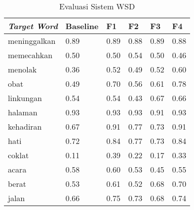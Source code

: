 \begin{table}
	\centering
	\caption{Evaluasi Sistem WSD}
	\label{table:wsd-evaluation}
	\begin{tabular}{|p{3cm}|p{1.5cm}|p{1.5cm}|p{1.5cm}|p{1.5cm}|p{1.5cm}|}
		\hline
		\textit{Target Word} & Baseline & F1 & F2 & F3 & F4
		\\ \hline
		meninggalkan & 0.89 & 0.89 & 0.88 & 0.89 & 0.88
		\\ \hline
		memecahkan & 0.50 & 0.50 & \cellcolor{blue!25}0.54 & 0.50 & 0.46
		\\ \hline
		menolak & 0.36 & \cellcolor{blue!25}0.52 & \cellcolor{blue!25}0.49 & \cellcolor{blue!25}0.52 & \cellcolor{blue!25}0.60
		\\ \hline
		obat & 0.49 & \cellcolor{blue!25}0.70 & \cellcolor{blue!25}0.56 & \cellcolor{blue!25}0.61 & \cellcolor{blue!25}0.78
		\\ \hline
		linkungan & 0.54 & 0.54 & 0.43 & \cellcolor{blue!25}0.67 & \cellcolor{blue!25}0.66
		\\ \hline
		halaman & 0.93 & 0.93 & 0.93 & 0.91 & 0.93
		\\ \hline
		kehadiran & 0.67 & \cellcolor{blue!25}0.91 & \cellcolor{blue!25}0.77 & \cellcolor{blue!25}0.73 & \cellcolor{blue!25}0.91
		\\ \hline
		hati & 0.72 & \cellcolor{blue!25}0.84 & \cellcolor{blue!25}0.77 & \cellcolor{blue!25}0.73 & \cellcolor{blue!25}0.84
		\\ \hline
		coklat & 0.11 & \cellcolor{blue!25}0.39 & \cellcolor{blue!25}0.22 & \cellcolor{blue!25}0.17 & \cellcolor{blue!25}0.33
		\\ \hline
		acara & 0.58 & \cellcolor{blue!25}0.60 & 0.53 & 0.45 & 0.55
		\\ \hline
		berat & 0.53 & \cellcolor{blue!25}0.61 & 0.52 & \cellcolor{blue!25}0.68 & \cellcolor{blue!25}0.70
		\\ \hline
		jalan & 0.66 & \cellcolor{blue!25}0.75 & \cellcolor{blue!25}0.73 & \cellcolor{blue!25}0.68 & \cellcolor{blue!25}0.74
		\\ \hline
	\end{tabular}
\end{table}

